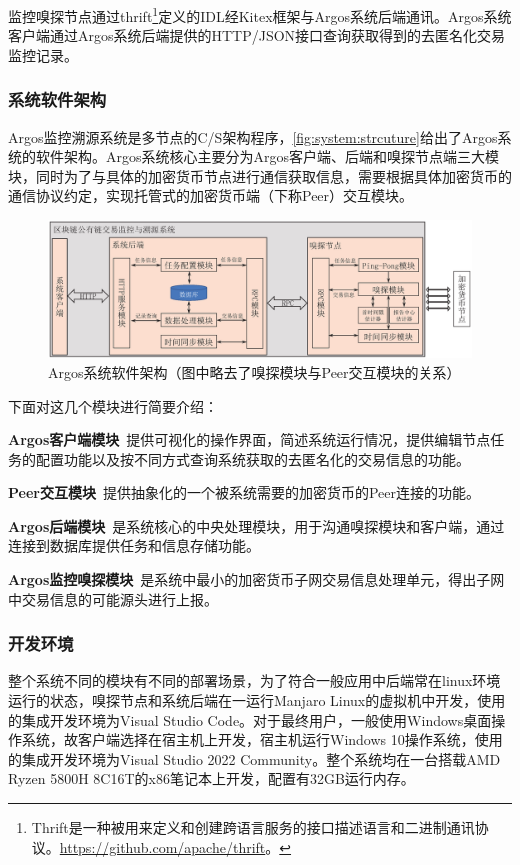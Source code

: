 \documentclass[supercite]{HustGraduPaper}
\newcommand{\xfig}[3]{
  \begin{figure}[htb]
    \centering
    #3
    \caption{#2}
    \label{fig:#1}
  \end{figure}
}
\newcommand{\rfig}[1]{\autoref{fig:#1}}
\theoremstyle{definition}
\begin{document}
监控嗅探节点通过thrift\footnote{Thrift是一种被用来定义和创建跨语言服务的接口描述语言和二进制通讯协议。\url{https://github.com/apache/thrift}。}定义的IDL经Kitex框架与Argos系统后端通讯。Argos系统客户端通过Argos系统后端提供的HTTP/JSON接口查询获取得到的去匿名化交易监控记录。

\subsubsection{系统软件架构}

Argos监控溯源系统是多节点的C/S架构程序，\rfig{system:strcuture}给出了Argos系统的软件架构。Argos系统核心主要分为Argos客户端、后端和嗅探节点端三大模块，同时为了与具体的加密货币节点进行通信获取信息，需要根据具体加密货币的通信协议约定，实现托管式的加密货币端（下称Peer）交互模块。

\xfig{system:strcuture}{Argos系统软件架构（图中略去了嗅探模块与Peer交互模块的关系）}{
  \includegraphics[width=\textwidth]{images/3.2-structure.ps}
}

下面对这几个模块进行简要介绍：

\textbf{Argos客户端模块}\ 提供可视化的操作界面，简述系统运行情况，提供编辑节点任务的配置功能以及按不同方式查询系统获取的去匿名化的交易信息的功能。

\textbf{Peer交互模块}\ 提供抽象化的一个被系统需要的加密货币的Peer连接的功能。

\textbf{Argos后端模块}\ 是系统核心的中央处理模块，用于沟通嗅探模块和客户端，通过连接到数据库提供任务和信息存储功能。

\textbf{Argos监控嗅探模块}\ 是系统中最小的加密货币子网交易信息处理单元，得出子网中交易信息的可能源头进行上报。

\subsubsection{开发环境}
整个系统不同的模块有不同的部署场景，为了符合一般应用中后端常在linux环境运行的状态，嗅探节点和系统后端在一运行Manjaro Linux的虚拟机中开发，使用的集成开发环境为Visual Studio Code。对于最终用户，一般使用Windows桌面操作系统，故客户端选择在宿主机上开发，宿主机运行Windows 10操作系统，使用的集成开发环境为Visual Studio 2022 Community。整个系统均在一台搭载AMD Ryzen 5800H 8C16T的x86笔记本上开发，配置有32GB运行内存。
\end{document}
